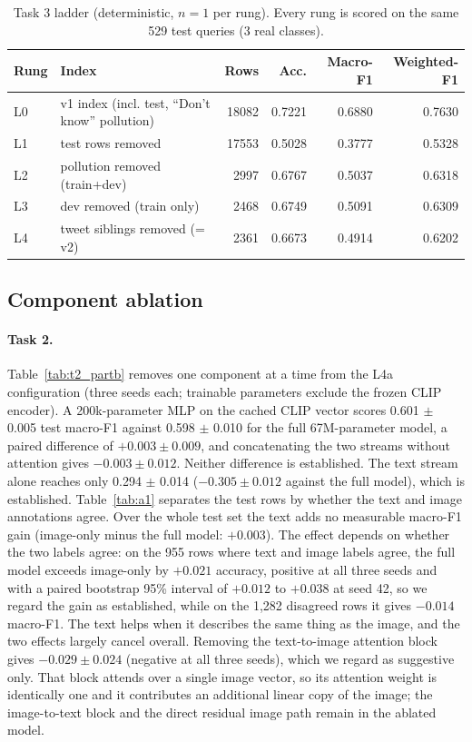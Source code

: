\begin{table}[t]
\centering
\footnotesize
\caption{Task 3 ladder (deterministic, $n=1$ per rung). Every rung is scored on the same 529 test queries (3 real classes).}
\label{tab:t3_ladder}
\begin{tabular}{llrrrr}
\toprule
Rung & Index & Rows & Acc. & Macro-F1 & Weighted-F1 \\
\midrule
L0 & v1 index (incl. test, ``Don't know'' pollution) & 18082 & 0.7221 & 0.6880 & 0.7630 \\
L1 & test rows removed & 17553 & 0.5028 & 0.3777 & 0.5328 \\
L2 & pollution removed (train+dev) & 2997 & 0.6767 & 0.5037 & 0.6318 \\
L3 & dev removed (train only) & 2468 & 0.6749 & 0.5091 & 0.6309 \\
L4 & tweet siblings removed (= v2) & 2361 & 0.6673 & 0.4914 & 0.6202 \\
\bottomrule
\end{tabular}
\end{table}

\subsection{Component ablation}
\label{sec:ablation-components}

\paragraph{Task 2.}
Table~\ref{tab:t2_partb} removes one component at a time from the L4a configuration (three seeds each; trainable parameters exclude the frozen CLIP encoder).
A 200k-parameter MLP on the cached CLIP vector scores 0.601 $\pm$ 0.005 test macro-F1 against 0.598 $\pm$ 0.010 for the full 67M-parameter model, a paired difference of $+0.003 \pm 0.009$, and concatenating the two streams without attention gives $-0.003 \pm 0.012$.
Neither difference is established.
The text stream alone reaches only 0.294 $\pm$ 0.014 ($-0.305 \pm 0.012$ against the full model), which is established.
Table~\ref{tab:a1} separates the test rows by whether the text and image annotations agree.
Over the whole test set the text adds no measurable macro-F1 gain (image-only minus the full model: $+0.003$).
The effect depends on whether the two labels agree: on the 955 rows where text and image labels agree, the full model exceeds image-only by $+0.021$ accuracy, positive at all three seeds and with a paired bootstrap 95\% interval of $+0.012$ to $+0.038$ at seed 42, so we regard the gain as established, while on the 1,282 disagreed rows it gives $-0.014$ macro-F1.
The text helps when it describes the same thing as the image, and the two effects largely cancel overall.
Removing the text-to-image attention block gives $-0.029 \pm 0.024$ (negative at all three seeds), which we regard as suggestive only.
That block attends over a single image vector, so its attention weight is identically one and it contributes an additional linear copy of the image; the image-to-text block and the direct residual image path remain in the ablated model.

